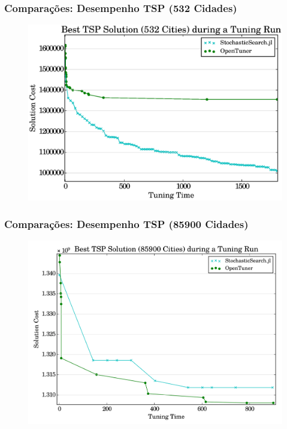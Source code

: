 \documentclass[10pt, compress]{beamer}
\begin{document}
\begin{frame}[fragile]
    \frametitle{Comparações: Desempenho TSP (532 Cidades)}
    \begin{figure}[H]
        \centering
        \includegraphics[width=1\textwidth]{att532_30min_best_comparison}
    \end{figure}%
\end{frame}

\begin{frame}[fragile]
    \frametitle{Comparações: Desempenho TSP (85900 Cidades)}
    \begin{figure}[H]
        \centering
        \includegraphics[width=1\textwidth]{pla85900_15min_best_comparison}
    \end{figure}%
\end{frame}
\end{document}
